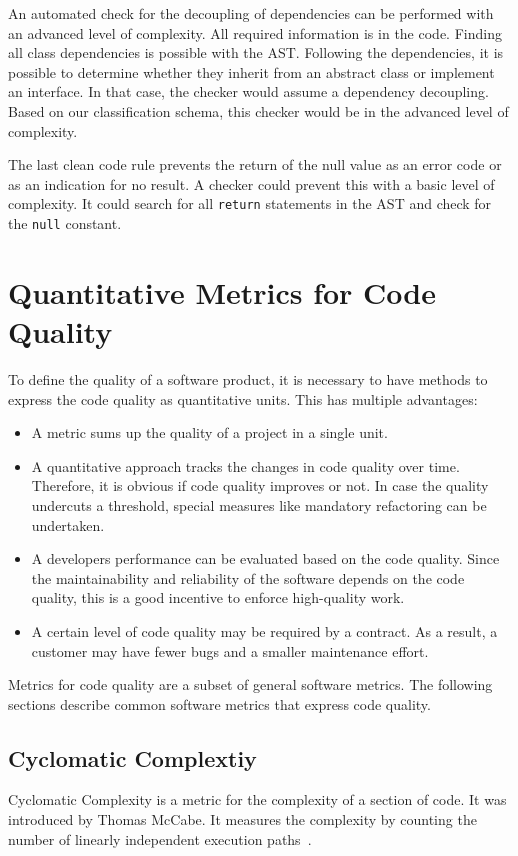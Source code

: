 An automated check for the decoupling of dependencies can be performed with an advanced level of complexity. All required information is in the code. Finding all class dependencies is possible with the AST. Following the dependencies, it is possible to determine whether they inherit from an abstract class or implement an interface. In that case, the checker would assume a dependency decoupling. Based on our classification schema, this checker would be in the advanced level of complexity.

The last clean code rule prevents the return of the null value as an error code or as an indication for no result. A checker could prevent this with a basic level of complexity. It could search for all \texttt{return} statements in the AST and check for the \texttt{null} constant.

\section{Quantitative Metrics for Code Quality}
To define the quality of a software product, it is necessary to have methods to express the code quality as quantitative units. This has multiple advantages:
\begin{itemize}
    \item A metric sums up the quality of a project in a single unit.
    \item A quantitative approach tracks the changes in code quality over time. Therefore, it is obvious if code quality improves or not. In case the quality undercuts a threshold, special measures like mandatory refactoring can be undertaken.
    \item A developers performance can be evaluated based on the code quality. Since the maintainability and reliability of the software depends on the code quality, this is a good incentive to enforce high-quality work.
    \item A certain level of code quality may be required by a contract. As a result, a customer may have fewer bugs and a smaller maintenance effort.
\end{itemize}
Metrics for code quality are a subset of general software metrics. The following sections describe common software metrics that express code quality.

\subsection{Cyclomatic Complextiy}\label{sec:cyclomatic_complexity}
Cyclomatic Complexity is a metric for the complexity of a section of code. It was introduced by Thomas McCabe. It measures the complexity by counting the number of linearly independent execution paths~\cite{mccabe_complexity_1976}. 


